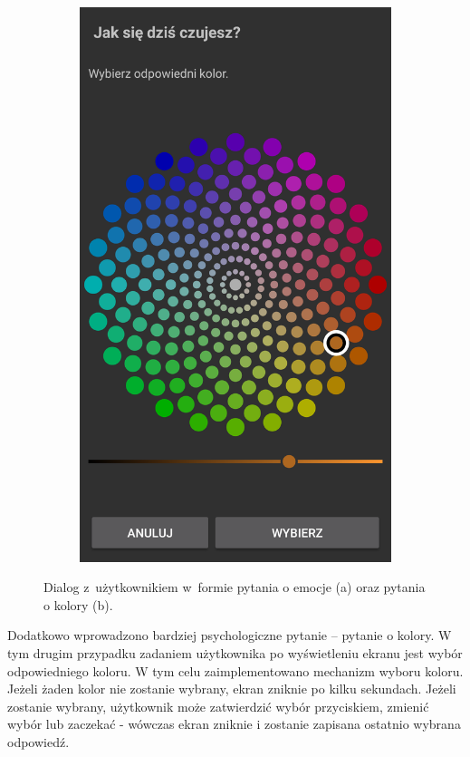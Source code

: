 \begin{figure}[H]
	\begin{subfigure}{0.35\textwidth}
		\centering
		\includegraphics[scale=0.13]{rozdzial3/screen-color.png}
		\subcaption{\label{subfigure_b}}
	\end{subfigure}
	\caption{ Dialog z~użytkownikiem w~formie pytania o emocje (a) oraz pytania o kolory (b).}
\end{figure}

Dodatkowo wprowadzono bardziej psychologiczne pytanie -- pytanie o kolory. W tym drugim przypadku zadaniem użytkownika po wyświetleniu ekranu jest wybór odpowiedniego koloru. W tym celu zaimplementowano mechanizm wyboru koloru. Jeżeli żaden kolor nie zostanie wybrany, ekran zniknie po kilku sekundach. Jeżeli zostanie wybrany, użytkownik może zatwierdzić wybór przyciskiem, zmienić wybór lub zaczekać - wówczas ekran zniknie i zostanie zapisana ostatnio wybrana odpowiedź.


